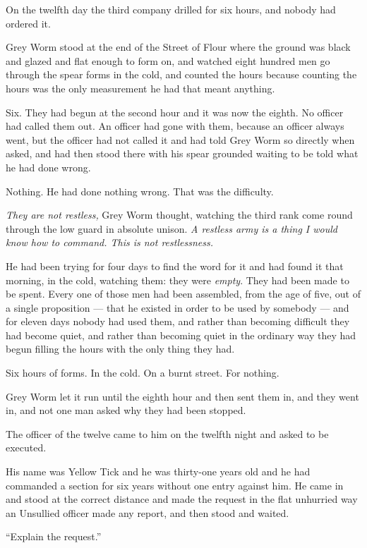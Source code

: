On the twelfth day the third company drilled for six hours, and nobody had ordered it.

Grey Worm stood at the end of the Street of Flour where the ground was black and glazed and flat enough to form on, and watched eight hundred men go through the spear forms in the cold, and counted the hours because counting the hours was the only measurement he had that meant anything.

Six. They had begun at the second hour and it was now the eighth. No officer had called them out. An officer had gone with them, because an officer always went, but the officer had not called it and had told Grey Worm so directly when asked, and had then stood there with his spear grounded waiting to be told what he had done wrong.

Nothing. He had done nothing wrong. That was the difficulty.

\textit{They are not restless,} Grey Worm thought, watching the third rank come round through the low guard in absolute unison. \textit{A restless army is a thing I would know how to command. This is not restlessness.}

He had been trying for four days to find the word for it and had found it that morning, in the cold, watching them: they were \textit{empty}. They had been made to be spent. Every one of those men had been assembled, from the age of five, out of a single proposition — that he existed in order to be used by somebody — and for eleven days nobody had used them, and rather than becoming difficult they had become quiet, and rather than becoming quiet in the ordinary way they had begun filling the hours with the only thing they had.

Six hours of forms. In the cold. On a burnt street. For nothing.

Grey Worm let it run until the eighth hour and then sent them in, and they went in, and not one man asked why they had been stopped.

\sceneBreak

The officer of the twelve came to him on the twelfth night and asked to be executed.

His name was Yellow Tick and he was thirty-one years old and he had commanded a section for six years without one entry against him. He came in and stood at the correct distance and made the request in the flat unhurried way an Unsullied officer made any report, and then stood and waited.

“Explain the request.”

